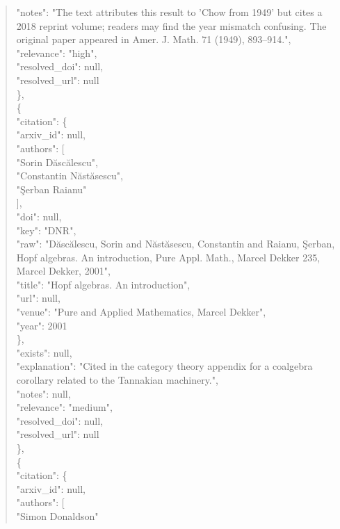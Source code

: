 \documentclass[11pt]{article}
\begin{document}
\begin{quote}
      "notes": "The text attributes this result to 'Chow from 1949' but cites a 2018 reprint volume; readers may find the year mismatch confusing. The original paper appeared in Amer. J. Math. 71 (1949), 893--914.",\\
      "relevance": "high",\\
      "resolved\_doi": null,\\
      "resolved\_url": null\\
    \},\\
    \{\\
      "citation": \{\\
        "arxiv\_id": null,\\
        "authors": [\\
          "Sorin Dăscălescu",\\
          "Constantin Năstăsescu",\\
          "Şerban Raianu"\\
        ],\\
        "doi": null,\\
        "key": "DNR",\\
        "raw": "Dăscălescu, Sorin and Năstăsescu, Constantin and Raianu, Şerban, Hopf algebras. An introduction, Pure Appl. Math., Marcel Dekker 235, Marcel Dekker, 2001",\\
        "title": "Hopf algebras. An introduction",\\
        "url": null,\\
        "venue": "Pure and Applied Mathematics, Marcel Dekker",\\
        "year": 2001\\
      \},\\
      "exists": null,\\
      "explanation": "Cited in the category theory appendix for a coalgebra corollary related to the Tannakian machinery.",\\
      "notes": null,\\
      "relevance": "medium",\\
      "resolved\_doi": null,\\
      "resolved\_url": null\\
    \},\\
    \{\\
      "citation": \{\\
        "arxiv\_id": null,\\
        "authors": [\\
          "Simon Donaldson"\\

\end{quote}
\end{document}
